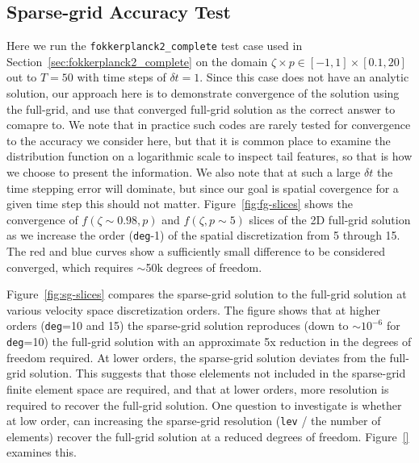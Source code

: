 \documentclass[preprint,11pt]{elsarticle}
\begin{document}
\subsection{Sparse-grid Accuracy Test}
\label{sec:sg-fokkerplanck2_complete}
%
Here we run the \texttt{fokkerplanck2\_complete} test case used in Section~\ref{sec:fokkerplanck2_complete} on the domain $\zeta\times p\in[-1,1]\times[0.1,20]$ out to $T=50$ with time steps of $\delta t = 1$. Since this case does not have an analytic solution, our approach here is to demonstrate convergence of the solution using the full-grid, and use that converged full-grid solution as the correct answer to comapre to. We note that in practice such codes are rarely tested for convergence to the accuracy we consider here, but that it is common place to examine the distribution function on a logarithmic scale to inspect tail features, so that is how we choose to present the information. We also note that at such a large $\delta t$ the time stepping error will dominate, but since our goal is spatial covergence for a given time step this should not matter. Figure~\ref{fig:fg-slices} shows the convergence of $f(\zeta\sim 0.98,p)$ and $f(\zeta,p\sim 5)$ slices of the 2D full-grid solution as we increase the order (\texttt{deg}-1) of the spatial discretization from 5 through 15. The red and blue curves show a sufficiently small difference to be considered converged, which requires $\sim$50k degrees of freedom.  

Figure~\ref{fig:sg-slices} compares the sparse-grid solution to the full-grid solution at various velocity space discretization orders. The figure shows that at higher orders (\texttt{deg}=10 and 15) the sparse-grid solution reproduces (down to $\sim 10^{-6}$ for \texttt{deg}=10) the full-grid solution with an approximate 5x reduction in the degrees of freedom required. At lower orders, the sparse-grid solution deviates from the full-grid solution. This suggests that those elelements not included in the sparse-grid finite element space are required, and that at lower orders, more resolution is required to recover the full-grid solution. One question to investigate is whether at low order, can increasing the sparse-grid resolution (\texttt{lev} / the number of elements) recover the full-grid solution at a reduced degrees of freedom. Figure~\ref{} examines this.      
\end{document}
